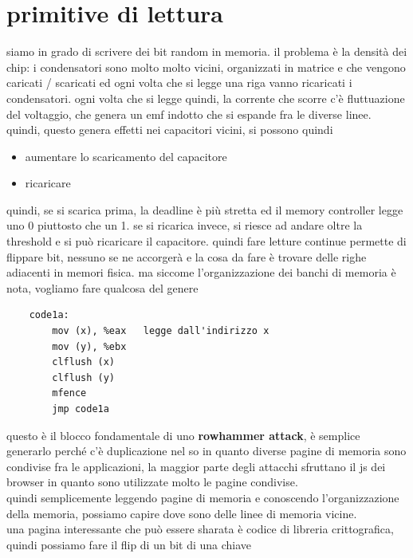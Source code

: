 \documentclass[12pt, oneside]{extbook} %
\begin{document}
\section{primitive di lettura}
siamo in grado di scrivere dei bit random in memoria. il problema è la densità dei chip: i condensatori sono molto molto vicini, organizzati in matrice e che vengono caricati / scaricati ed ogni volta che si legge una riga vanno ricaricati i condensatori. ogni volta che si legge quindi, la corrente che scorre c'è fluttuazione del voltaggio, che genera un emf indotto che si espande fra le diverse linee. quindi, questo genera effetti nei capacitori vicini, si possono quindi
\begin{itemize}
\item aumentare lo scaricamento del capacitore
\item ricaricare
\end{itemize}
quindi, se si scarica prima, la deadline è più stretta ed il memory controller legge uno 0 piuttosto che un 1. se si ricarica invece, si riesce ad andare oltre la threshold e si può ricaricare il capacitore. quindi fare letture continue permette di flippare bit, nessuno se ne accorgerà e la cosa da fare è trovare delle righe adiacenti in memori fisica. ma siccome l'organizzazione dei banchi di memoria è nota, vogliamo fare qualcosa del genere
\begin{lstlisting}
	code1a:
		mov (x), %eax	legge dall'indirizzo x
		mov (y), %ebx
		clflush (x)
		clflush (y)
		mfence
		jmp code1a
\end{lstlisting}
questo è il blocco fondamentale di uno \textbf{rowhammer attack}, è semplice generarlo perché c'è duplicazione nel so in quanto diverse pagine di memoria sono condivise fra le applicazioni, la maggior parte degli attacchi sfruttano il js dei browser in quanto sono utilizzate molto le pagine condivise.\\quindi semplicemente leggendo pagine di memoria e conoscendo l'organizzazione della memoria, possiamo capire dove sono delle linee di memoria vicine.\\ una pagina interessante che può essere sharata è codice di libreria crittografica, quindi possiamo fare il flip di un bit di una chiave
\end{document}

